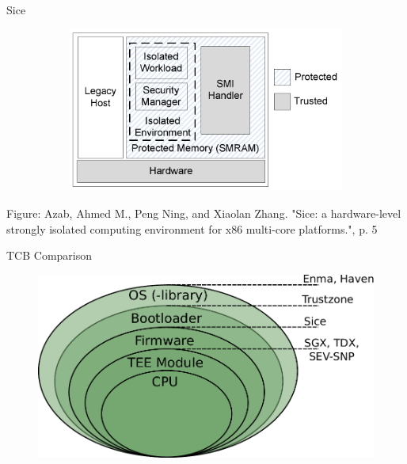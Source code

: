 \documentclass[aspectratio=169]{beamer}
\begin{document}
\begin{frame}{Sice}
    \begin{figure}
        \begin{subfigure}[]{0.6\textwidth}
            \includegraphics[width=\textwidth]{images/sice.png}
        \end{subfigure}
    \end{figure}
    \footnotesize{Figure: Azab, Ahmed M., Peng Ning, and Xiaolan Zhang. "Sice: a hardware-level strongly isolated computing environment for x86 multi-core platforms.", p. 5}
\end{frame}
\begin{frame}{TCB Comparison}
    \begin{center}
        \begin{figure}
            \includegraphics[width=.8\textwidth]{images/all_tcb.pdf}
        \end{figure}
    \end{center}
\end{frame}
\end{document}
